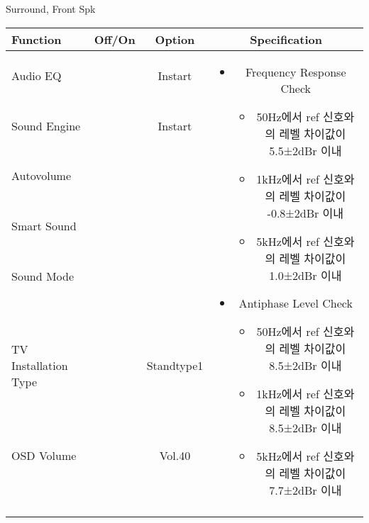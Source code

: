 \begin{frame}[t]{Surround, Front Spk}
\begin{tiny}
\begin{tabular}{@{}lccc@{}}
\toprule
Function & Off/On & Option & Specification \\
\midrule
Audio EQ & \color{black}{Off} & Instart &
\multirow{10}{60mm}{
\begin{itemize}
	\vspace{-3mm}
	\item Frequency Response Check
	\begin{itemize}
		\item 50Hz에서 ref 신호와의 레벨 차이값이 5.5±2dBr 이내
		\item 1kHz에서 ref 신호와의 레벨 차이값이 -0.8±2dBr 이내
		\item 5kHz에서 ref 신호와의 레벨 차이값이 1.0±2dBr 이내
	\end{itemize}
	\item Antiphase Level Check
	\begin{itemize}
		\item 50Hz에서 ref 신호와의 레벨 차이값이 8.5±2dBr 이내
		\item 1kHz에서 ref 신호와의 레벨 차이값이 8.5±2dBr 이내
		\item 5kHz에서 ref 신호와의 레벨 차이값이 7.7±2dBr 이내
	\end{itemize}
\end{itemize}
} \\
Sound Engine & \color{blue}{On} & Instart & \\
Autovolume & \color{black}{Off} & & \\
Smart Sound & \color{black}{Off} & & \\
Sound Mode & \color{blue}{On} & \color{blue}{Surround} & \\
TV Installation Type & \color{blue}{On} & Standtype1 & \\
OSD Volume & \color{blue}{On} & Vol.40 & \\
& & & \\
& & & \\
& & & \\
& & & \\
\midrule
\end{tabular}
\end{tiny}


\end{frame}

